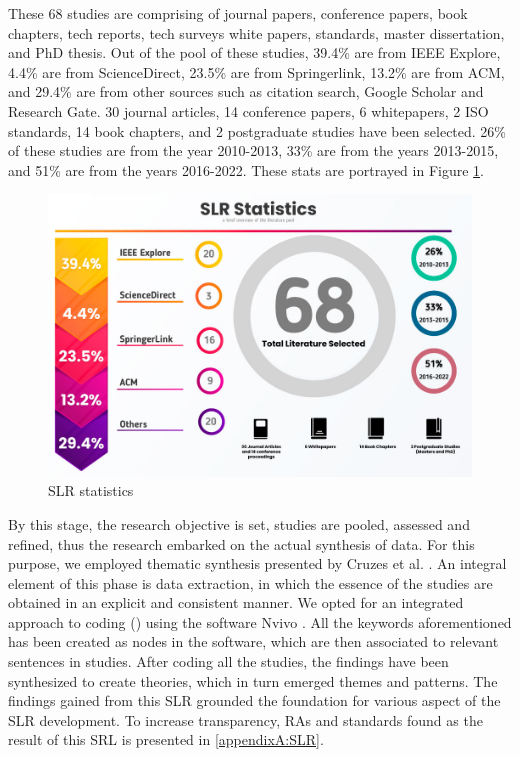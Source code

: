 \documentclass[review]{elsarticle}
\begin{document}
These 68 studies are comprising of journal papers, conference papers, book chapters, tech reports, tech surveys white papers, standards, master dissertation, and PhD thesis. Out of the pool of these studies, 39.4\% are from IEEE Explore, 4.4\% are from ScienceDirect, 23.5\% are from Springerlink, 13.2\% are from ACM, and 29.4\% are from other sources such as citation search, Google Scholar and Research Gate. 30 journal articles, 14 conference papers, 6 whitepapers, 2 ISO standards, 14 book chapters, and 2 postgraduate studies have been selected. 26\% of these studies are from the year 2010-2013, 33\% are from the years 2013-2015, and 51\% are from the years 2016-2022. These stats are portrayed in Figure \ref{fig:SLRStats}.

\begin{figure}[h!]
    \centering
    \includegraphics[width=12cm]{databases-statitistic.jpg}
    \caption{SLR statistics}
    \label{fig:SLRStats}
\end{figure}


By this stage, the research objective is set, studies are pooled, assessed and refined, thus the research embarked on the actual synthesis of data. For this purpose, we employed thematic synthesis presented by Cruzes et al. \cite{cruzes2011recommended}. An integral element of this phase is data extraction, in which the essence of the studies are obtained in an explicit and consistent manner. We opted for an integrated approach to coding (\cite{lofland1971analyzing}) using the software Nvivo \cite{nvivo}. All the keywords aforementioned has been created as nodes in the software, which are then associated to relevant sentences in studies. After coding all the studies, the findings have been synthesized to create theories, which in turn emerged themes and patterns. The findings gained from this SLR grounded the foundation for various aspect of the SLR development. To increase transparency, RAs and standards found as the result of this SRL is presented in \ref{appendixA:SLR}. 
   
\end{document}
